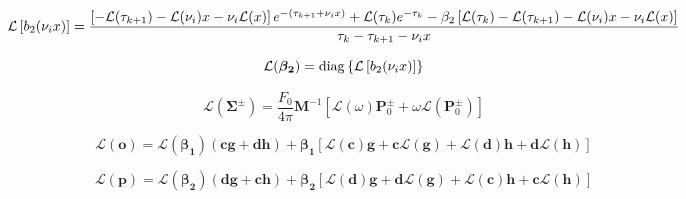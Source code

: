 \begin{adjustwidth}{-1in}{-1in}
\center
\begin{equation}
\mathcal{L}\left[b_{2}(\nu_{i}x)\right] = \frac{\left[-\mathcal{L}(\tau_{k+1}) - \mathcal{L}(\nu_{i})x - \nu_{i}\mathcal{L}(x)\right]e^{-(\tau_{k+1} + \nu_{i}x)} + \mathcal{L}(\tau_{k})e^{-\tau_{k}} - \beta_{2} \left[\mathcal{L}(\tau_{k}) - \mathcal{L}(\tau_{k+1}) - \mathcal{L}(\nu_{i})x - \nu_{i}\mathcal{L}(x)\right]}{\tau_{k} - \tau_{k+1} - \nu_{i}x}
\label{eq:mem-layer_quantities-particular_solution-tangent_linear-b2_l}
\end{equation}
\end{adjustwidth}

\begin{equation}
\mathcal{L}(\boldsymbol{\beta_{2}}) = \mathrm{diag}\left\{\mathcal{L}\left[b_{2}(\nu_{i}x)\right]\right\}
\label{eq:mem-layer_quantities-particular_solution-tangent_linear-lambda2_l}
\end{equation}

\begin{equation}
\mathcal{L}(\mathbf{\Sigma}^{\pm}) = \frac{F_{0}}{4 \pi} \mathbf{M}^{-1} \left[\mathcal{L}(\omega) \mathbf{P}^{\pm}_{0} + \omega \mathcal{L}(\mathbf{P}^{\pm}_{0})\right]
\label{eq:mem-layer_quantities-particular_solution-tangent_linear-Sigma_l}
\end{equation}

\begin{equation}
\mathcal{L}(\mathbf{o}) = \mathcal{L}(\boldsymbol{\beta_{1}})(\mathbf{c}\mathbf{g} + \mathbf{d}\mathbf{h}) + \boldsymbol{\beta_{1}}\left[\mathcal{L}(\mathbf{c})\mathbf{g} + \mathbf{c}\mathcal{L}(\mathbf{g}) + \mathcal{L}(\mathbf{d})\mathbf{h} + \mathbf{d}\mathcal{L}(\mathbf{h})\right]
\label{eq:mem-layer_quantities-particular_solution-tangent_linear-o_l}
\end{equation}

\begin{equation}
\mathcal{L}(\mathbf{p}) = \mathcal{L}(\boldsymbol{\beta_{2}})(\mathbf{d}\mathbf{g} + \mathbf{c}\mathbf{h}) + \boldsymbol{\beta_{2}}\left[\mathcal{L}(\mathbf{d})\mathbf{g} + \mathbf{d}\mathcal{L}(\mathbf{g}) + \mathcal{L}(\mathbf{c})\mathbf{h} + \mathbf{c}\mathcal{L}(\mathbf{h})\right]
\label{eq:mem-layer_quantities-particular_solution-tangent_linear-p_l}
\end{equation}



